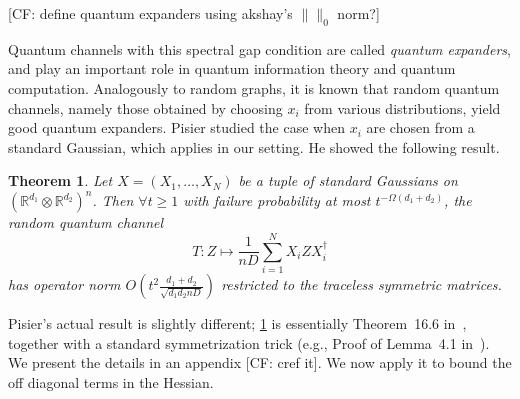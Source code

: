 \documentclass{article}
\newtheorem{theorem}{Theorem}
\newtheorem{corollary}[theorem]{Corollary}
\newcommand{\R}{{\mathbb{R}}}
\newcommand{\ot}{\otimes}
\newcommand\Sym{\mathcal{S}}
\newcommand\samp{x}
\newcommand\tr{\operatorname{Tr}}
\newcommand{\CF}[1]{{\color{purple}[CF: #1]}}
\newcommand{\AR}[1]{{\color{orange}[AR: #1]}}
\newcommand{\TODO}[1]{{\color{blue}[TODO: #1]}}
\begin{document}
\CF{define quantum expanders using akshay's $\|\|_0$ norm?}

Quantum channels with this spectral gap condition are called \emph{quantum expanders}, and play an important role in quantum information theory and quantum computation. Analogously to random graphs, it is known that random quantum channels, namely those obtained by choosing $x_i$ from various distributions, yield good quantum expanders. Pisier studied the case when $x_i$ are chosen from a standard Gaussian, which applies in our setting. He showed the following result. 


\begin{theorem}\label{thm:hess-pisier} Let $X = (X_1, \dots, X_N)$ be a tuple of standard Gaussians on $(\R^{d_1}\ot \R^{d_2})^n$. Then $\forall t \geq 1$ with failure probability at most $t^{-\Omega(d_{1} + d_{2})}$, the random quantum channel 
$$T: Z \mapsto \frac{1}{nD}\sum_{i = 1}^N X_i Z X_i^\dagger$$
has operator norm 
$O \left( t^{2} \frac{d_{1}+d_{2}}{\sqrt{d_{1} d_{2} nD}} \right)$ restricted to the traceless symmetric matrices. \end{theorem}
Pisier's actual result is slightly different; \cref{thm:hess-pisier} is essentially Theorem~16.6 in~\cite{pisier2012grothendieck}, together with a standard symmetrization trick (e.g., Proof of Lemma~4.1 in~\cite{P14}). We present the details in an appendix \CF{cref it}. We now apply it to bound the off diagonal terms in the Hessian.


\end{document}
